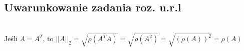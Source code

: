 \documentclass[twocolumn]{article}
\begin{document}
\begin{flushleft}
\section{Uwarunkowanie zadania roz. u.r.l}
\\
Jeśli $A=A^T$, to $||A||_2 = \sqrt{\rho(A^TA)}=\sqrt{\rho(A^2)} =\sqrt{(\rho(A))^2}=\rho(A)$\\
\end{flushleft}
\end{document}
